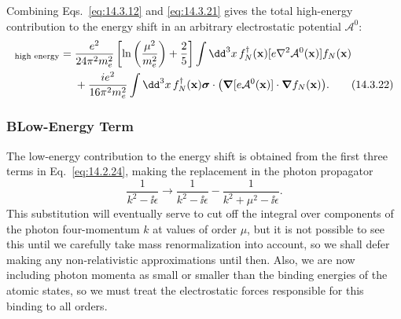 Combining Eqs.~\eqref{eq:14.3.12} and \eqref{eq:14.3.21} gives the total
high-energy contribution to the energy shift in an arbitrary electrostatic
potential $\mathcal A^0$:
\begin{align}
[\delta E_N]_{\text{high energy}}={}&
\frac{e^2}{24\pi^2m_e^2}
\left[\ln\left(\frac{\mu^2}{m_e^2}\right)+\frac25\right]
\int \dd^3x\,f_N^\dagger(\mathbf x)
[e\nabla^2\mathcal A^0(\mathbf x)]f_N(\mathbf x)\notag\\
&+\frac{ie^2}{16\pi^2m_e^2}\int \dd^3x\,
f_N^\dagger(\mathbf x)\boldsymbol\sigma\cdot
\bigl(\boldsymbol\nabla[e\mathcal A^0(\mathbf x)]
\mathbin{\cdot}\boldsymbol\nabla f_N(\mathbf x)\bigr).
\tag{14.3.22}\label{eq:14.3.22}
\end{align}

\subsubsection*{B\quad Low-Energy Term}

The low-energy contribution to the energy shift is obtained from the first
three terms in Eq.~\eqref{eq:14.2.24}, making the replacement in the photon
propagator
\begin{equation}
\frac{1}{k^2-\ii\epsilon}\longrightarrow
\frac{1}{k^2-\ii\epsilon}-\frac{1}{k^2+\mu^2-\ii\epsilon}.
\tag{14.3.23}\label{eq:14.3.23}
\end{equation}
This substitution will eventually serve to cut off the integral over
components of the photon four-momentum $k$ at values of order $\mu$, but it is
not possible to see this until we carefully take mass renormalization into
account, so we shall defer making any non-relativistic approximations until
then. Also, we are now including photon momenta as small or smaller than the
binding energies of the atomic states, so we must treat the electrostatic
forces responsible for this binding to all orders.

